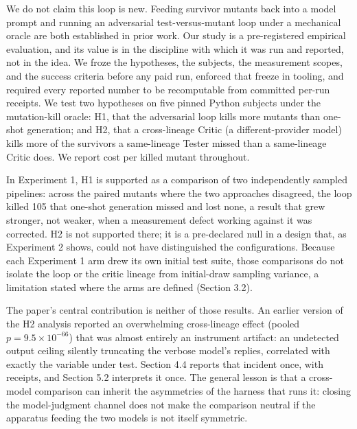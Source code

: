 \documentclass[
  11pt,
]{article}
\newcounter{none} %
\begin{document}
We do not claim this loop is new. Feeding survivor mutants back into a
model prompt and running an adversarial test-versus-mutant loop under a
mechanical oracle are both established in prior work. Our study is a
pre-registered empirical evaluation, and its value is in the discipline
with which it was run and reported, not in the idea. We froze the
hypotheses, the subjects, the measurement scopes, and the success
criteria before any paid run, enforced that freeze in tooling, and
required every reported number to be recomputable from committed per-run
receipts. We test two hypotheses on five pinned Python subjects under
the mutation-kill oracle: H1, that the adversarial loop kills more
mutants than one-shot generation; and H2, that a cross-lineage Critic (a
different-provider model) kills more of the survivors a same-lineage
Tester missed than a same-lineage Critic does. We report cost per killed
mutant throughout.

In Experiment 1, H1 is supported as a comparison of two independently
sampled pipelines: across the paired mutants where the two approaches
disagreed, the loop killed 105 that one-shot generation missed and lost
none, a result that grew stronger, not weaker, when a measurement defect
working against it was corrected. H2 is not supported there; it is a
pre-declared null in a design that, as Experiment 2 shows, could not
have distinguished the configurations. Because each Experiment 1 arm
drew its own initial test suite, those comparisons do not isolate the
loop or the critic lineage from initial-draw sampling variance, a
limitation stated where the arms are defined (Section 3.2).

The paper's central contribution is neither of those results. An earlier
version of the H2 analysis reported an overwhelming cross-lineage effect
(pooled $p = 9.5 \times 10^{-66}$) that was almost entirely an instrument
artifact: an undetected output ceiling silently truncating the verbose
model's replies, correlated with exactly the variable under test.
Section 4.4 reports that incident once, with receipts, and Section 5.2
interprets it once. The general lesson is that a cross-model comparison
can inherit the asymmetries of the harness that runs it: closing the
model-judgment channel does not make the comparison neutral if the
apparatus feeding the two models is not itself symmetric.
\end{document}

